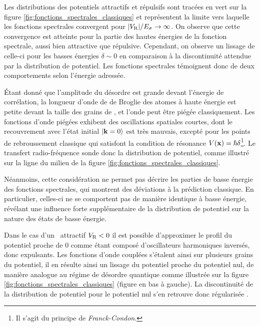 Les distributions des potentiels attractifs et répulsifs sont tracées en vert sur la figure \ref{fig:fonctions_spectrales_classiques} et représentent la limite vers laquelle les fonctions spectrales convergent pour $|V_{\mathrm{R}}|/E_{\sigma}\rightarrow\infty$. On observe que cette convergence est atteinte pour la partie des hautes énergies de la fonction spectrale, aussi bien attractive que répulsive. Cependant, on observe un lissage de celle-ci pour les basses énergies $\delta\sim 0$ en comparaison à la discontinuité attendue par la distribution de potentiel. Les fonctions spectrales témoignent donc de deux comportements selon l'énergie adressée.

Étant donné que l'amplitude du désordre est grande devant l'énergie de corrélation, la longueur d'onde de de Broglie des atomes à haute énergie est petite devant la taille des grains de \speckle , et l'onde peut être piégée classiquement. Les fonctions d'onde piégées exhibent des oscillations spatiales courtes, dont le recouvrement avec l'état initial $\left| \mathbf{k}=0 \right\rangle$ est très mauvais, excepté pour les points de rebroussement classique qui satisfont la condition de résonance $V(\mathbf{x})=\hslash\delta$\footnote{Il s'agit du principe de \emph{Franck-Condon}.}. Le transfert radio-fréquence sonde donc la distribution de potentiel, comme illustré sur la ligne du milieu de la figure \ref{fig:fonctions_spectrales_classiques}.

Néanmoins, cette considération ne permet pas décrire les parties de basse énergie des fonctions spectrales, qui montrent des déviations à la prédiction classique. En particulier, celles-ci ne se comportent pas de manière identique à basse énergie, révélant une influence forte supplémentaire de la distribution de potentiel sur la nature des états de basse énergie.

Dans le cas d'un \speckle\ attractif $V_{\mathrm{R}}<0$ il est possible d'approximer le profil du potentiel proche de 0 comme étant composé d'oscillateurs harmoniques inversés, donc expulsants. Les fonctions d'onde couplées s'étalent ainsi sur plusieurs grains du potentiel, il en résulte ainsi un lissage du potentiel proche du potentiel nul, de manière analogue au régime de désordre quantique comme illustrée sur la figure \ref{fig:fonctions_spectrales_classiques} (figure en bas à gauche). La discontinuité de la distribution de potentiel pour le potentiel nul s'en retrouve donc régularisée \citep{prat2016semiclassical}.

